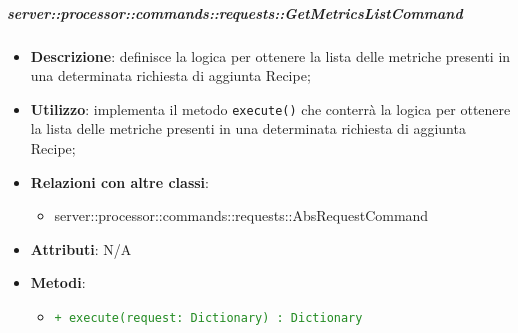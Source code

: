         \subparagraph{server::processor::commands::requests::GetMetricsListCommand} %
        \label{subp:bdsm_app_server_processor_commands_requests_getmetricslistcommand}
        \begin{itemize}
          \item \textbf{Descrizione}: definisce la logica per ottenere la lista delle metriche presenti in una determinata richiesta di aggiunta Recipe;
          \item \textbf{Utilizzo}: implementa il metodo \texttt{execute()} che conterrà la logica per ottenere la lista delle metriche presenti in una determinata richiesta di aggiunta Recipe;
          \item \textbf{Relazioni con altre classi}:
            \begin{itemize}
              \item server::processor::commands::requests::AbsRequestCommand
            \end{itemize}
          \item \textbf{Attributi}: N/A
          \item \textbf{Metodi}:
          \begin{itemize}
              \item \textcolor{forestgreen}{\texttt{+ execute(request: Dictionary) : Dictionary}}
          \end{itemize}
        \end{itemize}

